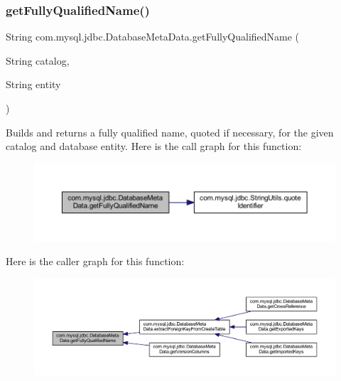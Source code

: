 \subsubsection{\texorpdfstring{get\+Fully\+Qualified\+Name()}{getFullyQualifiedName()}}
{\footnotesize\ttfamily String com.\+mysql.\+jdbc.\+Database\+Meta\+Data.\+get\+Fully\+Qualified\+Name (\begin{DoxyParamCaption}\item[{String}]{catalog,  }\item[{String}]{entity }\end{DoxyParamCaption})\hspace{0.3cm}{\ttfamily [protected]}}

Builds and returns a fully qualified name, quoted if necessary, for the given catalog and database entity. Here is the call graph for this function\+:\nopagebreak
\begin{figure}[H]
\begin{center}
\leavevmode
\includegraphics[width=350pt]{classcom_1_1mysql_1_1jdbc_1_1_database_meta_data_aa24b9831163c2cfb148ff010252a76a3_cgraph}
\end{center}
\end{figure}
Here is the caller graph for this function\+:\nopagebreak
\begin{figure}[H]
\begin{center}
\leavevmode
\includegraphics[width=350pt]{classcom_1_1mysql_1_1jdbc_1_1_database_meta_data_aa24b9831163c2cfb148ff010252a76a3_icgraph}
\end{center}
\end{figure}
\mbox{\label{classcom_1_1mysql_1_1jdbc_1_1_database_meta_data_ac3dfe62ad76ecff89524d11761f24a11}} 
